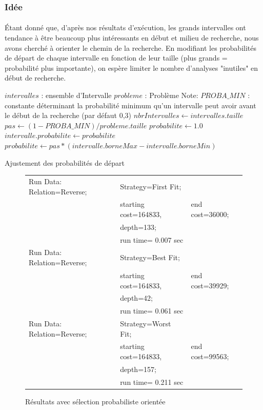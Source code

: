 \documentclass[a4paper,10pt]{report}
\begin{document}
\subsubsection{Idée}

\paragraph{}
  Étant donné que, d'après nos résultats d'exécution, les grands intervalles ont
tendance à être beaucoup plus intéressants en début et milieu de recherche, nous
avons cherché à orienter le chemin de la recherche. En modifiant les
probabilités de départ de chaque intervalle en fonction de leur taille (plus
grands = probabilité plus importante), on espère limiter le nombre d'analyses
"inutiles" en début de recherche.


\begin{algorithm}
  \begin{algorithmic}
    \Require $intervalles$ : ensemble d'Intervalle
    \Require $probleme$ : Problème
    \State 
    \Comment Note: $PROBA\_MIN$ : constante déterminant la probabilité minimum
qu'un
intervalle peut avoir avant le début de la recherche (par défaut 0,3)
    \State
    \State $nbrIntervalles \gets intervalles.taille$
    \State $pas \gets (1 - PROBA\_MIN) / probleme.taille$
    \State $probabilite \gets 1.0$
      \State $intervalle.probabilite \gets probabilite$
      \State $probabilite \gets pas * (intervalle.borneMax -
intervalle.borneMin)$
    \EndFor
  \end{algorithmic}
  \caption{Ajustement des probabilités de départ}
\end{algorithm}


\begin{figure}[h]
 \begin{tabular}{lll}
  Run Data: Relation=Reverse;&
    Strategy=First Fit;\\
    &starting cost=164833,&
    end cost=36000;\\
    &depth=133;\\
    &run time= 0.007 sec\\
  Run Data: Relation=Reverse;&
    Strategy=Best Fit;\\
    &starting cost=164833,&
    end cost=39929;\\
    &depth=42;\\
    &run time= 0.061 sec\\
  Run Data: Relation=Reverse;&
    Strategy=Worst Fit;\\
    &starting cost=164833,&
    end cost=99563;\\
    &depth=157;\\
    &run time= 0.211 sec\\
 \end{tabular}
 \caption{Résultats avec sélection probabiliste orientée}
\end{figure}
\end{document}

